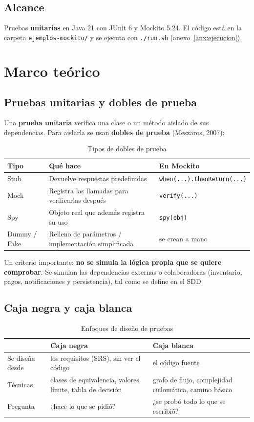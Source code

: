 \documentclass[11pt,a4paper,oneside]{report}
\newcommand{\code}[1]{\texttt{#1}}
\begin{document}
\section{Alcance}
Pruebas \textbf{unitarias} en Java 21 con JUnit 6 y Mockito 5.24. El código está en la carpeta \code{ejemplos-mockito/} y se ejecuta con \code{./run.sh} (anexo~\ref{anx:ejecucion}).

\chapter{Marco teórico}
\section{Pruebas unitarias y dobles de prueba}
Una \textbf{prueba unitaria} verifica una clase o un método aislado de sus dependencias. Para aislarla se usan \textbf{dobles de prueba} (Meszaros, 2007):

\begin{table}[H]
\centering
\caption{Tipos de dobles de prueba}
\small
\begin{tabularx}{\linewidth}{lXl}
\toprule
\textbf{Tipo} & \textbf{Qué hace} & \textbf{En Mockito}\\
\midrule
Stub & Devuelve respuestas predefinidas & \code{when(...).thenReturn(...)}\\
Mock & Registra las llamadas para verificarlas después & \code{verify(...)}\\
Spy & Objeto real que además registra su uso & \code{spy(obj)}\\
Dummy / Fake & Relleno de parámetros / implementación simplificada & se crean a mano\\
\bottomrule
\end{tabularx}
\end{table}

Un criterio importante: \textbf{no se simula la lógica propia que se quiere comprobar}. Se simulan las dependencias externas o colaboradoras (inventario, pagos, notificaciones y persistencia), tal como se define en el SDD.

\section{Caja negra y caja blanca}
\begin{table}[H]
\centering
\caption{Enfoques de diseño de pruebas}
\small
\begin{tabularx}{\linewidth}{lXX}
\toprule
& \textbf{Caja negra} & \textbf{Caja blanca}\\
\midrule
Se diseña desde & los requisitos (SRS), sin ver el código & el código fuente\\
Técnicas & clases de equivalencia, valores límite, tabla de decisión & grafo de flujo, complejidad ciclomática, camino básico\\
Pregunta & ¿hace lo que se pidió? & ¿se probó todo lo que se escribió?\\
\bottomrule
\end{tabularx}
\end{table}
\end{document}
